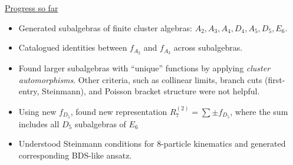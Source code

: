 \documentclass[12pt]{article}
\newcommand*\checked{\item[\checkmark]}
\begin{document}
\thispagestyle{fancyplain}
\fancyhf{}


\underline{Progress so far}
\begin{itemize}
	\checked Generated subalgebras of finite cluster algebras: $A_2, A_3, A_4, D_4, A_5, D_5, E_6$.
	\checked Catalogued identities between $f_{A_2}$ and $f_{A_3}$ across subalgebras.
	\checked Found larger subalgebras with ``unique'' functions by applying \emph{cluster automorphisms}. Other criteria, such as collinear limits, branch cuts (first-entry, Steinmann), and Poisson bracket structure were not helpful.
	\checked Using new $f_{D_5}$, found new representation $R^{(2)}_7=\sum \pm f_{D_5}$, where the sum includes all $D_5$ subalgebras of $E_6$
	\checked Understood Steinmann conditions for 8-particle kinematics and generated corresponding BDS-like ansatz. \\
\end{itemize}
\end{document}
